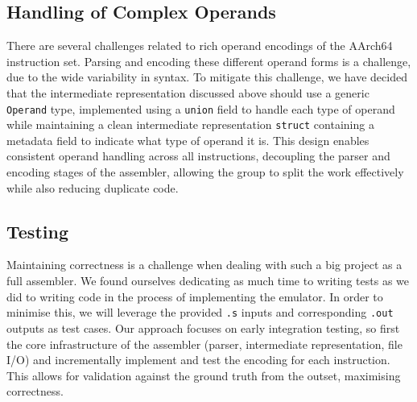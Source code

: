 \documentclass[9.5pt]{article}
\begin{document}
\subsection{Handling of Complex Operands}
There are several challenges related to rich operand encodings of the AArch64 instruction set. Parsing and encoding these different operand forms is a challenge, due to the wide variability in syntax. To mitigate this challenge, we have decided that the intermediate representation discussed above should use a generic \texttt{Operand} type, implemented using a \texttt{union} field to handle each type of operand while maintaining a clean intermediate representation \texttt{struct} containing a metadata field to indicate what type of operand it is. This design enables consistent operand handling across all instructions, decoupling the parser and encoding stages of the assembler, allowing the group to split the work effectively while also reducing duplicate code.

\subsection{Testing}
Maintaining correctness is a challenge when dealing with such a big project as a full assembler. We found ourselves dedicating as much time to writing tests as we did to writing code in the process of implementing the emulator. In order to minimise this, we will leverage the provided \texttt{.s} inputs and corresponding \texttt{.out} outputs as test cases. Our approach focuses on early integration testing, so first the core infrastructure of the assembler (parser, intermediate representation, file I/O) and incrementally implement and test the encoding for each instruction. This allows for validation against the ground truth from the outset, maximising correctness. 
\end{document}
